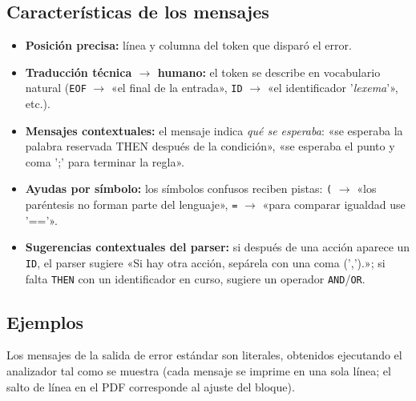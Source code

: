 \documentclass[12pt,a4paper]{article}
\begin{document}
\subsection{Características de los mensajes}
\begin{itemize}
  \item \textbf{Posición precisa:} línea y columna del token que disparó el
        error.
  \item \textbf{Traducción técnica $\to$ humano:} el token se describe en
        vocabulario natural (\texttt{EOF} $\to$ «el final de la entrada»,
        \texttt{ID} $\to$ «el identificador '\emph{lexema}'», etc.).
  \item \textbf{Mensajes contextuales:} el mensaje indica \emph{qué se
        esperaba}: «se esperaba la palabra reservada THEN después de la
        condición», «se esperaba el punto y coma ';' para terminar la regla».
  \item \textbf{Ayudas por símbolo:} los símbolos confusos reciben pistas:
        \texttt{(} $\to$ «los paréntesis no forman parte del lenguaje»,
        \texttt{=} $\to$ «para comparar igualdad use '=='».
  \item \textbf{Sugerencias contextuales del parser:} si después de una
        acción aparece un \texttt{ID}, el parser sugiere «Si hay otra acción,
        sepárela con una coma (',').»; si falta \texttt{THEN} con un
        identificador en curso, sugiere un operador \texttt{AND}/\texttt{OR}.
\end{itemize}

\subsection{Ejemplos}
Los mensajes de la salida de error estándar son literales, obtenidos ejecutando
el analizador tal como se muestra (cada mensaje se imprime en una sola línea;
el salto de línea en el PDF corresponde al ajuste del bloque).
\end{document}
